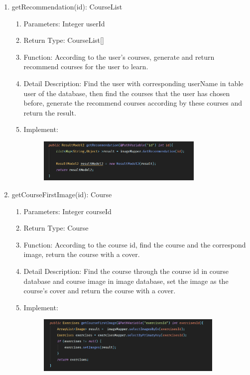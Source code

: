 \documentclass[16pt]{scrreprt}
\begin{document}
\begin{enumerate}
	
	\item getRecommendation(id): CourseList
	\begin{enumerate}
		\item Parameters: Integer userId
		\item Return Type: CourseList[]
		\item Function: According to the user's courses, generate and return recommend courses for the user to learn.
		\item Detail Description: Find the user with corresponding userName in table user of the database, then find the courses that the user has chosen before, generate the recommend courses according by these courses and return the result.
		\item Implement:
		\begin{figure}[H]
	\centering
	\includegraphics[width=0.8\textwidth]{diagrams/getRecommendation.png}\\
\end{figure}
	\end{enumerate}
	\item getCourseFirstImage(id): Course
	\begin{enumerate}
		\item Parameters: Integer courseId
		\item Return Type: Course
		\item Function: According to the course id, find the course and the correspond image, return the course with a cover.
		\item Detail Description: Find the course through the course id in course database and course image in image database, set the image as the course's cover and return the course with a cover.
		\item Implement:
		\begin{figure}[H]
	\centering
	\includegraphics[width=0.9\textwidth]{diagrams/getCourseFirstImage.png}\\

\end{figure}
\end{enumerate}
\end{enumerate}
\end{document}

